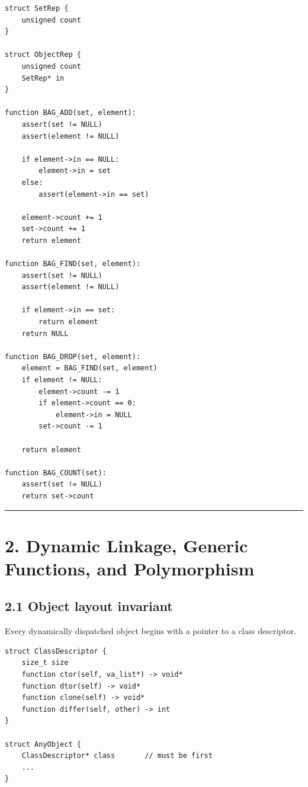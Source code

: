 \documentclass[11pt]{article}
\begin{document}
\begin{verbatim}
struct SetRep {
    unsigned count
}

struct ObjectRep {
    unsigned count
    SetRep* in
}

function BAG_ADD(set, element):
    assert(set != NULL)
    assert(element != NULL)

    if element->in == NULL:
        element->in = set
    else:
        assert(element->in == set)

    element->count += 1
    set->count += 1
    return element

function BAG_FIND(set, element):
    assert(set != NULL)
    assert(element != NULL)

    if element->in == set:
        return element
    return NULL

function BAG_DROP(set, element):
    element = BAG_FIND(set, element)
    if element != NULL:
        element->count -= 1
        if element->count == 0:
            element->in = NULL
        set->count -= 1

    return element

function BAG_COUNT(set):
    assert(set != NULL)
    return set->count
\end{verbatim}

\begin{center}\rule{0.5\linewidth}{0.5pt}\end{center}

\section{2. Dynamic Linkage, Generic Functions, and
Polymorphism}\label{dynamic-linkage-generic-functions-and-polymorphism}

\subsection{2.1 Object layout invariant}\label{object-layout-invariant}

Every dynamically dispatched object begins with a pointer to a class
descriptor.

\begin{verbatim}
struct ClassDescriptor {
    size_t size
    function ctor(self, va_list*) -> void*
    function dtor(self) -> void*
    function clone(self) -> void*
    function differ(self, other) -> int
}

struct AnyObject {
    ClassDescriptor* class       // must be first
    ...
}
\end{verbatim}
\end{document}
